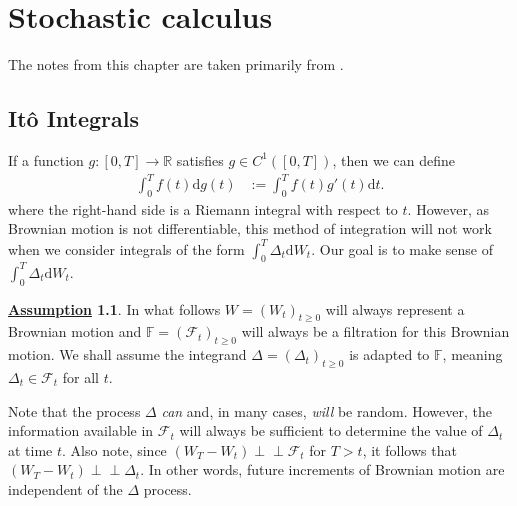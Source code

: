 \documentclass[12pt]{book}
\numberwithin{equation}{chapter}
\theoremstyle{plain}
\numberwithin{theorem}{section}
\theoremstyle{definition}
\newtheorem{assumption}[theorem]{\underline{Assumption}}
\numberwithin{exercise}{chapter}
\newcommand{\<}{\langle}
\renewcommand{\>}{\rangle}
\renewcommand{\(}{\left(}
\renewcommand{\)}{\right)}
\renewcommand{\[}{\left[}
\renewcommand{\]}{\right]}
\newcommand\Fb{\mathds{F}}
\newcommand\Rb{\mathds{R}}
\newcommand\Fc{\mathscr{F}}
\newcommand\Del{\Delta}
\newcommand{\ind}{\perp \! \! \! \perp}
\newcommand\dd{\mathrm{d}}
\begin{document}
\chapter{Stochastic calculus}
\label{chapter:stoch.calc}

The notes from this chapter are taken primarily from \cite[Chapters 4 and 5]{shreve2004}.


\section{It\^o Integrals}
\label{sec:ito.integral}

If a function $g : [0,T] \to \Rb$ satisfies $g \in C^1([0,T])$, then we can define
\begin{align}
\int_0^T f(t) \dd g(t)
	&:=	\int_0^T f(t) g'(t) \dd t .
\end{align}
where the right-hand side is a Riemann integral with respect to $t$.  However, as Brownian motion is not differentiable, this method of integration will not work when we consider integrals of the form $\int_0^T \Del_t \dd W_t$.  Our goal is to make sense of $\int_0^T \Del_t \dd W_t$.

\begin{assumption}
In what follows $W=(W_t)_{t \geq 0}$ will always represent a Brownian motion and $\Fb=(\Fc_t)_{t \geq 0}$ will always be a filtration for this Brownian motion.
We shall assume the integrand $\Del = (\Del_t)_{t \geq 0}$ is adapted to $\Fb$, meaning $\Del_t \in \Fc_t$ for all $t$.
\end{assumption}

\noindent
Note that the process $\Del$ \emph{can} and, in many cases, \emph{will} be random.  However, the information available in $\Fc_t$ will always be sufficient to determine the value of $\Del_t$ at time $t$.  Also note, since $(W_T - W_t) \ind \Fc_t$ for $T>t$, it follows that $(W_T - W_t) \ind \Del_t$.  In other words, future increments of Brownian motion are independent of the $\Del$ process.
\end{document}
